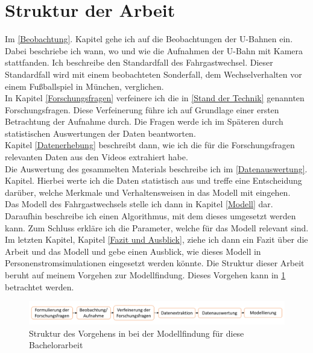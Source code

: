 \section{Struktur der Arbeit} \label{Struktur der Arbeit}
Im \ref{Beobachtung}. Kapitel gehe ich auf die Beobachtungen der U-Bahnen ein. Dabei beschriebe ich wann, wo und wie die Aufnahmen der U-Bahn mit Kamera stattfanden. Ich beschreibe den Standardfall des Fahrgastwechsel. Dieser Standardfall wird mit einem beobachteten Sonderfall, dem Wechselverhalten vor einem Fußballspiel in München, verglichen.\\
In Kapitel \ref{Forschungsfragen} verfeinere ich die in \ref{Stand der Technik} genannten Forschungsfragen. Diese Verfeinerung führe ich auf Grundlage einer ersten Betrachtung der Aufnahme durch. Die Fragen werde ich im Späteren durch statistischen Auswertungen der Daten beantworten.\\
Kapitel \ref{Datenerhebung} beschreibt dann, wie ich die für die Forschungsfragen relevanten Daten aus den Videos extrahiert habe.\\
Die Auswertung des gesammelten Materials beschreibe ich im \ref{Datenauswertung}. Kapitel. Hierbei werte ich die Daten statistisch aus und treffe eine Entscheidung darüber, welche Merkmale und Verhaltensweisen in das Modell mit eingehen.\\
Das Modell des Fahrgastwechsels stelle ich dann in Kapitel \ref{Modell} dar. Daraufhin beschreibe ich einen Algorithmus, mit dem dieses umgesetzt werden kann. Zum Schluss erkläre ich die Parameter, welche für das Modell relevant sind. \\
Im letzten Kapitel, Kapitel \ref{Fazit und Ausblick}, ziehe ich dann ein Fazit über die Arbeit und das Modell und gebe einen Ausblick, wie dieses Modell in Personenstromsimulationen eingesetzt werden könnte.
Die Struktur dieser Arbeit beruht auf meinem Vorgehen zur Modellfindung. Dieses Vorgehen kann in \figurename \ref{fig:Vorgehen} betrachtet werden.
\begin{figure}[H]
	\centering
		\includegraphics[width=1.0\textwidth]{pictures/introduction/strukture/strukture_work.png}
	\caption{Struktur des Vorgehens in bei der Modellfindung für diese Bachelorarbeit}
	\label{fig:Vorgehen}
\end{figure}
 
